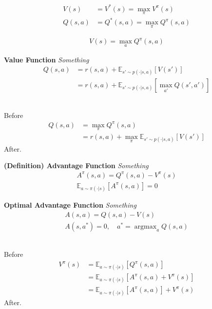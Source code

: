 \begin{align*}
    V(s) &= V^{*}(s) = \max_{\pi}V^{\pi}(s) \\
    Q(s,a) &= Q^{*}(s,a) = \max_{\pi}Q^{\pi}(s,a)
\end{align*}



\begin{align*}
    V(s) = \max_{a}Q^{\pi}(s,a)
\end{align*}




\begin{tcolorbox}
\textbf{
    Value Function
} 
\textit{
    Something
}
\begin{align*}
    Q(s,a) & = r(s,a) + \mathbb{E}_{s' \sim p(\cdot|s,a)}[V(s')] \\
    & = r(s,a) + \mathbb{E}_{s' \sim p(\cdot|s,a)}[\max_{a'}Q(s',a')]
\end{align*}
\end{tcolorbox}

\begin{solution}\ \\
Before
\begin{align*}
    Q(s,a) & = \max_{\pi}Q^{\pi}(s,a) \\
    & = r(s,a) + \max_{\pi}\mathbb{E}_{s' \sim p(\cdot|s,a)}[V(s')]
\end{align*}
After.
\end{solution}





\begin{tcolorbox}
\textbf{
    (Definition) Advantage Function
} 
\textit{
    Something
}
\begin{align*}
    A^{\pi}(s,a) = Q^{\pi}(s,a) - V^{\pi}(s) \\
    \mathbb{E}_{a \sim \pi(\cdot|s)}[A^{\pi}(s,a)] = 0
\end{align*}
\end{tcolorbox}





\begin{tcolorbox}
\textbf{
    Optimal Advantage Function
} 
\textit{
    Something
}
\begin{align*}
    A(s,a) = Q(s,a) - V(s) \\
    A(s,a^{*}) = 0, \quad a^{*} = \mathop{\arg\max}_{a}Q(s,a)
\end{align*}
\end{tcolorbox}

\begin{solution}\ \\
Before
\begin{align*}
    V^{\pi}(s) & = \mathbb{E}_{a \sim \pi(\cdot|s)}[Q^{\pi}(s,a)] \\
    & = \mathbb{E}_{a \sim \pi(\cdot|s)}[A^{\pi}(s,a) + V^{\pi}(s)] \\
    & = \mathbb{E}_{a \sim \pi(\cdot|s)}[A^{\pi}(s,a)] + V^{\pi}(s)
\end{align*}
After.
\end{solution}











